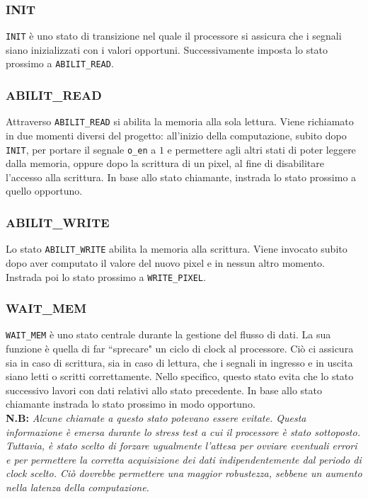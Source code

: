\documentclass[11pt, a4paper]{article}
\begin{document}
\subsubsection{INIT}
\texttt{INIT} è uno stato di transizione nel quale il processore si assicura che i segnali siano inizializzati con i valori opportuni. Successivamente imposta lo stato prossimo a \texttt{ABILIT\_READ}.

\subsubsection{ABILIT\_READ}
Attraverso \texttt{ABILIT\_READ} si abilita la memoria alla sola lettura. Viene richiamato in due momenti diversi del progetto: all'inizio della computazione, subito dopo \texttt{INIT}, per portare il segnale \texttt{o\_en} a $1$ e permettere agli altri stati di poter leggere dalla memoria, oppure dopo la scrittura di un pixel, al fine di disabilitare l'accesso alla scrittura. In base allo stato chiamante, instrada lo stato prossimo a quello opportuno.

\subsubsection{ABILIT\_WRITE}
Lo stato \texttt{ABILIT\_WRITE} abilita la memoria alla scrittura. Viene invocato subito dopo aver computato il valore del nuovo pixel e in nessun altro momento. Instrada poi lo stato prossimo a \texttt{WRITE\_PIXEL}.

\pagebreak
\subsubsection{WAIT\_MEM}
\texttt{WAIT\_MEM} è uno stato centrale durante la gestione del flusso di dati. La sua funzione è quella di far ``sprecare" un ciclo di clock al processore. Ciò ci assicura sia in caso di scrittura, sia in caso di lettura, che i segnali in ingresso e in uscita siano letti o scritti correttamente. Nello specifico, questo stato evita che lo stato successivo lavori con dati relativi allo stato precedente. In base allo stato chiamante instrada lo stato prossimo in modo opportuno.\\

\textbf{N.B:} \textit{Alcune chiamate a questo stato potevano essere evitate. Questa informazione è emersa durante lo stress test a cui il processore è stato sottoposto. Tuttavia, è stato scelto di forzare ugualmente l’attesa per ovviare eventuali errori e per permettere la corretta acquisizione dei dati indipendentemente dal periodo di clock scelto. Ciò dovrebbe permettere una maggior robustezza, sebbene un aumento nella latenza della computazione.}
\end{document}
